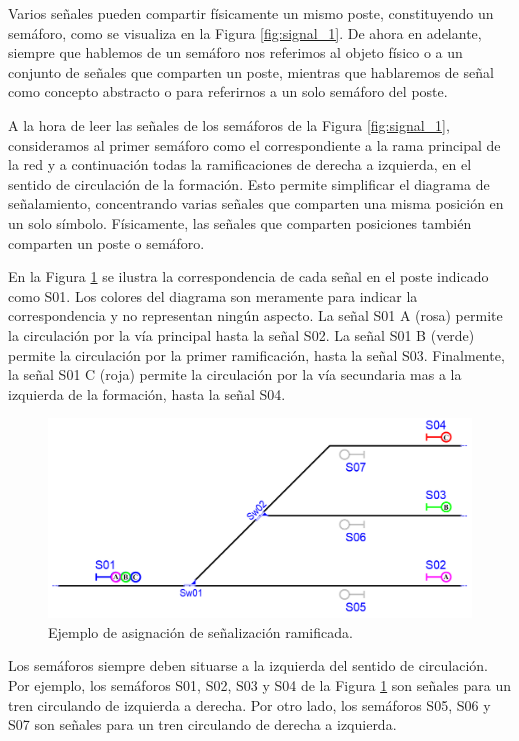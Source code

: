     Varios señales pueden compartir físicamente un mismo poste, constituyendo un semáforo, como se visualiza en la Figura \ref{fig:signal_1}. De ahora en adelante, siempre que hablemos de un semáforo nos referimos al objeto físico o a un conjunto de señales que comparten un poste, mientras que hablaremos de señal como concepto abstracto o para referirnos a un solo semáforo del poste.
    
    A la hora de leer las señales de los semáforos de la Figura \ref{fig:signal_1}, consideramos al primer semáforo como el correspondiente a la rama principal de la red y a continuación todas la ramificaciones de derecha a izquierda, en el sentido de circulación de la formación. Esto permite simplificar el diagrama de señalamiento, concentrando varias señales que comparten una misma posición en un solo símbolo. Físicamente, las señales que comparten posiciones también comparten un poste o semáforo.

    En la Figura \ref{fig:signal_2} se ilustra la correspondencia de cada señal en el poste indicado como S01. Los colores del diagrama son meramente para indicar la correspondencia y no representan ningún aspecto. La señal S01 A (rosa)  permite la circulación por la vía principal hasta la señal S02. La señal S01 B (verde) permite la circulación por la primer ramificación, hasta la señal S03. Finalmente, la señal S01 C (roja) permite la circulación por la vía secundaria mas a la izquierda de la formación, hasta la señal S04.

    \begin{figure}[H]
        \centering
        \includegraphics[width=1\textwidth]{Figuras/semaforos.PNG}
        \centering\caption{Ejemplo de asignación de señalización ramificada.}
        \label{fig:signal_2}
    \end{figure}

    Los semáforos siempre deben situarse a la izquierda del sentido de circulación. Por ejemplo, los semáforos S01, S02, S03 y S04 de la Figura \ref{fig:signal_2} son señales para un tren circulando de izquierda a derecha. Por otro lado, los semáforos S05, S06 y S07 son señales para un tren circulando de derecha a izquierda.